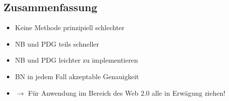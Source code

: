 \documentclass[a5paper,16pt,oneside,landscape]{scrartcl}
\begin{document}
  \subsection*{Zusammenfassung}
  \begin{itemize}
    \item Keine Methode prinzipiell schlechter
    \item NB und PDG teils schneller
    \item NB und PDG leichter zu implementieren
    \item BN in jedem Fall akzeptable Genauigkeit
    \item $\rightarrow$ Für Anwendung im Bereich des Web 2.0 alle in Erwägung ziehen!
  \end{itemize}
\end{document}
